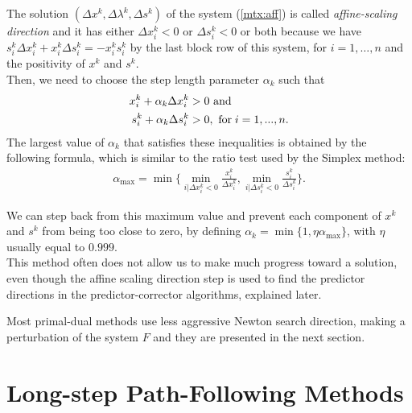 \documentclass[a4paper,10 pt,titlepage,twoside]{book}
\theoremstyle{plain}
\theoremstyle{definition}
\theoremstyle{remark}
\begin{document}
The solution $\left(\Delta x^{k},\Delta\lambda^{k},\Delta s^{k}\right)$ of the system (\ref{mtx:aff}) is called \textit{affine-scaling direction} and it has either $\Delta x_{i}^{k}<0$ or $\Delta s_{i}^{k}<0$ or both because we have $s^{k}_{i}\Delta x^{k}_{i} + x^{k}_{i}\Delta s^{k}_{i} = - x^{k}_{i}s^{k}_{i}$ by the last block row of this system, for $i=1,\dots,n$ and the positivity of $x^{k}$ and $s^{k}$.\\
Then, we need to choose the step length parameter $\alpha_{k}$ such that
\begin{align*}
x^{k}_{i} + \alpha_{k} \Delta x^{k}_{i} &>0 \text{ and}\\
s^{k}_{i} + \alpha_{k} \Delta s^{k}_{i} &>0,\text{ for\;} i = 1,...,n. 
\end{align*}
The largest value of $\alpha_{k}$ that satisfies these inequalities is obtained by the following formula, which is similar to the ratio test used by the Simplex method:
\begin{align*}
\alpha_{\text{max}} = \min\biggl\{\min_{i|\Delta x^{k}_{i}<0}\frac{x^{k}_{i}}{\Delta x^{k}_{i}}, \min_{i|\Delta s^{k}_{i}<0}\frac{s^{k}_{i}}{\Delta s^{k}_{i}}\biggr\}.
\end{align*} 

We can step back from this maximum value and prevent each component of $x^{k}$ and $s^{k}$ from being too close to zero, by defining $\alpha_{k} = \min\{1,\eta\alpha_{\text{max}}\}$, with $\eta$ usually equal to $0.999$.\\
This method often does not allow us to make much progress toward a solution, even though the affine scaling direction step is used to find the predictor directions in the predictor-corrector algorithms, explained later.

Most primal-dual methods use less aggressive Newton search direction, making a perturbation of the system $F$ and they are presented in the next section.


\section{Long-step Path-Following Methods}
\end{document}

